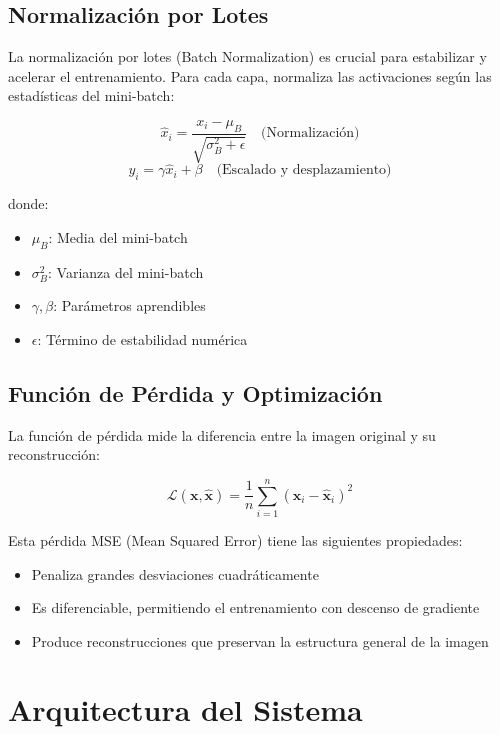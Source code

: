 \documentclass[conference]{IEEEtran}
\begin{document}
\subsection{Normalización por Lotes}
La normalización por lotes (Batch Normalization) es crucial para estabilizar y acelerar el entrenamiento. Para cada capa, normaliza las activaciones según las estadísticas del mini-batch:

\begin{equation}
\hat{x}_i = \frac{x_i - \mu_B}{\sqrt{\sigma^2_B + \epsilon}} \quad \text{(Normalización)}
\end{equation}
\begin{equation}
y_i = \gamma\hat{x}_i + \beta \quad \text{(Escalado y desplazamiento)}
\end{equation}

donde:
\begin{itemize}
    \item \(\mu_B\): Media del mini-batch
    \item \(\sigma^2_B\): Varianza del mini-batch
    \item \(\gamma, \beta\): Parámetros aprendibles
    \item \(\epsilon\): Término de estabilidad numérica
\end{itemize}

\subsection{Función de Pérdida y Optimización}
La función de pérdida mide la diferencia entre la imagen original y su reconstrucción:

\begin{equation}
\mathcal{L}(\mathbf{x}, \hat{\mathbf{x}}) = \frac{1}{n}\sum_{i=1}^{n}(\mathbf{x}_i - \hat{\mathbf{x}}_i)^2
\end{equation}

Esta pérdida MSE (Mean Squared Error) tiene las siguientes propiedades:
\begin{itemize}
    \item Penaliza grandes desviaciones cuadráticamente
    \item Es diferenciable, permitiendo el entrenamiento con descenso de gradiente
    \item Produce reconstrucciones que preservan la estructura general de la imagen
\end{itemize}

\section{Arquitectura del Sistema}
\end{document}
